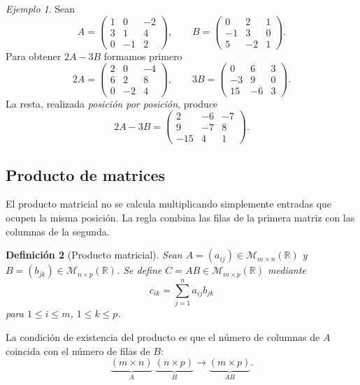 \documentclass[12pt]{article}
\newtheorem{definicion}{Definición}[section]
\theoremstyle{remark}
\newtheorem{ejemplo}[definicion]{Ejemplo}
\newcommand{\R}{\mathbb{R}}
\newcommand{\Mat}[2]{\mathcal{M}_{#1\times #2}}
\begin{document}
\begin{ejemplo}
Sean
\[
A=\begin{pmatrix}1&0&-2\\3&1&4\\0&-1&2\end{pmatrix},\qquad
B=\begin{pmatrix}0&2&1\\-1&3&0\\5&-2&1\end{pmatrix}.
\]
Para obtener $2A-3B$ formamos primero
\[
2A=\begin{pmatrix}2&0&-4\\6&2&8\\0&-2&4\end{pmatrix},\qquad
3B=\begin{pmatrix}0&6&3\\-3&9&0\\15&-6&3\end{pmatrix}.
\]
La resta, realizada \emph{posición por posición}, produce
\[
\boxed{2A-3B=\begin{pmatrix}2&-6&-7\\9&-7&8\\-15&4&1\end{pmatrix}.}
\]
\end{ejemplo}
\subsection*{Producto de matrices}
El producto matricial no se calcula multiplicando simplemente entradas que ocupen la misma posición. La regla combina las filas de la primera matriz con las columnas de la segunda.

\begin{definicion}[Producto matricial]
Sean $A=(a_{ij})\in\Mat{m}{n}(\R)$ y $B=(b_{jk})\in\Mat{n}{p}(\R)$. Se define $C=AB\in\Mat{m}{p}(\R)$ mediante
\[
\boxed{\quad c_{ik}=\sum_{j=1}^{n}a_{ij}b_{jk}\quad}
\]
para $1\le i\le m$, $1\le k\le p$.
\end{definicion}

La condición de existencia del producto es que el número de columnas de $A$ coincida con el número de filas de $B$:
\[
\underbrace{(m\times n)}_A\ \underbrace{(n\times p)}_B
\longrightarrow\underbrace{(m\times p)}_{AB}.
\]
\end{document}
